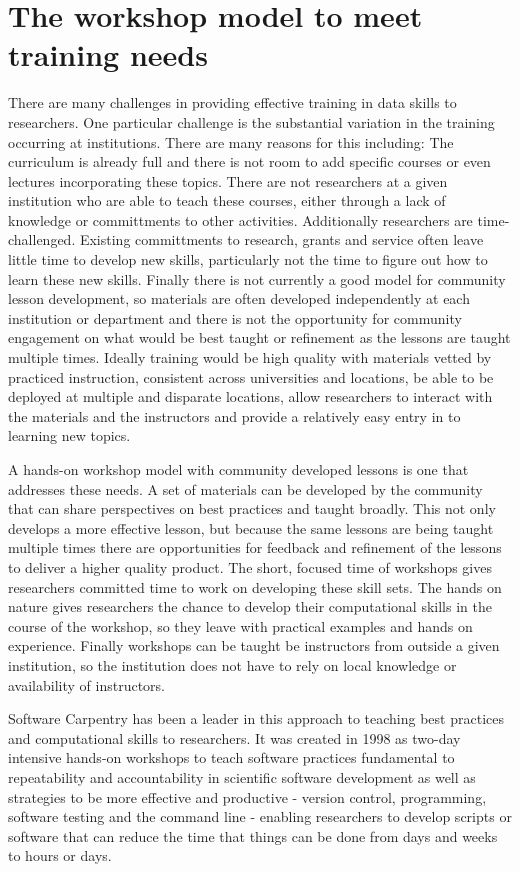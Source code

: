 \documentclass[15]{idcc}
\begin{document}
\section{The workshop model to meet training needs}

There are many challenges in providing effective training in data skills to researchers. One particular challenge is
the substantial variation in the training occurring at institutions. There are many reasons for this including: The curriculum
is already full and there is not room to add specific courses or even lectures incorporating these topics. There are
not researchers at a given institution who are able to teach these courses, either through a lack of knowledge
or committments to other activities. Additionally researchers are time-challenged. Existing committments to research, grants and service often leave little time to develop new skills, particularly not the time to figure out how to learn these new skills. Finally
there is not currently a good model for community lesson development, so materials are often developed independently at
each institution or department and there is not the opportunity for community engagement on what would be best taught or
refinement as the lessons are taught multiple times.
Ideally training would
be high quality with materials vetted by practiced instruction, consistent across universities and locations, be able
to be deployed at multiple and disparate locations, allow researchers to interact with the materials and the
instructors and provide a relatively easy entry in to learning new topics.

A hands-on workshop model with community developed lessons is one that addresses these needs. A set of materials can be developed by the community that can share perspectives on best practices and taught broadly. This not only develops a more effective lesson, but
because the same lessons are being taught multiple times there are opportunities for feedback and refinement of the lessons to deliver a higher quality product. The short, focused time of workshops gives researchers committed time to work on developing these skill
sets. The hands on nature gives researchers the chance to develop their computational skills in the course of the workshop, so they
leave with practical examples and hands on experience. Finally workshops can be taught be instructors from outside a given institution, so the institution does not have to rely on local knowledge or availability of instructors.

Software Carpentry has been a leader in this approach to teaching best practices and computational skills to researchers. It was created in 1998 as two-day
intensive hands-on workshops to teach software practices fundamental to repeatability and accountability in scientific software
development as well as strategies to be more effective and productive - version control, programming, software testing and the command
line - enabling researchers to develop scripts or software that can reduce the time that things can be done from days and weeks to hours
or days.
\end{document}

